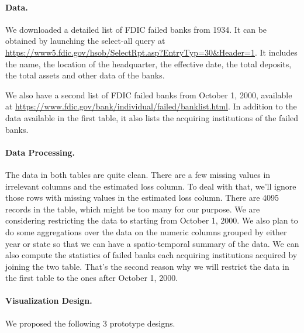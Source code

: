 \paragraph{Data.}
We downloaded a detailed list of FDIC failed banks from 1934. It can be
obtained by launching the select-all query at
\url{https://www5.fdic.gov/hsob/SelectRpt.asp?EntryTyp=30&Header=1}. It
includes the name, the location of the headquarter, the effective date, the
total deposits, the total assets and other data of the banks.

We also have a second list of FDIC failed banks from October 1, 2000, available
at \url{https://www.fdic.gov/bank/individual/failed/banklist.html}. In
addition to the data available in the first table, it also lists the acquiring
institutions of the failed banks.

\paragraph{Data Processing.}
The data in both tables are quite clean. There are a few missing values in
irrelevant columns and the estimated loss column. To deal with that, we'll
ignore those rows with missing values in the estimated loss column. There are
4095 records in the table, which might be too many for our purpose. We are
considering restricting the data to starting from October 1, 2000. We also
plan to do some aggregations over the data on the numeric columns grouped by
either year or state so that we can have a spatio-temporal summary of the
data. We can also compute the statistics of failed banks each acquiring
institutions acquired by joining the two table. That's the second reason why
we will restrict the data in the first table to the ones after October 1,
2000.

\paragraph{Visualization Design.} We proposed the following 3 prototype designs.

